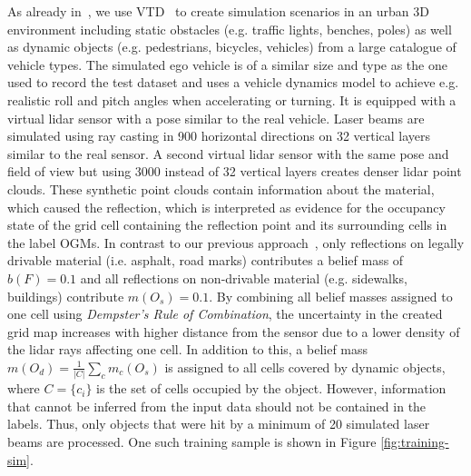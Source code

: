 \documentclass[conference]{IEEEtran}
\begin{document}
As already in~\cite{vanKempen.2021b}, we use VTD~\cite{VirtualTestDrive.2022} to create simulation scenarios in an urban 3D environment including static obstacles (e.g. traffic lights, benches, poles) as well as dynamic objects (e.g. pedestrians, bicycles, vehicles) from a large catalogue of vehicle types. The simulated ego vehicle is of a similar size and type as the one used to record the test dataset and uses a vehicle dynamics model to achieve e.g. realistic roll and pitch angles when accelerating or turning. It is equipped with a virtual lidar sensor with a pose similar to the real vehicle. Laser beams are simulated using ray casting in 900 horizontal directions on 32 vertical layers similar to the real sensor. A second virtual lidar sensor with the same pose and field of view but using 3000 instead of 32 vertical layers creates denser lidar point clouds. These synthetic point clouds contain information about the material, which caused the reflection, which is interpreted as evidence for the occupancy state of the grid cell containing the reflection point and its surrounding cells in the label OGMs. In contrast to our previous approach~\cite{vanKempen.2021b}, only reflections on legally drivable material (i.e. asphalt, road marks) contributes a belief mass of $b(F)=0.1$ and all reflections on non-drivable material (e.g. sidewalks, buildings) contribute $m(O_s)=0.1$. By combining all belief masses assigned to one cell using \textit{Dempster's Rule of Combination}, the uncertainty in the created grid map increases with higher distance from the sensor due to a lower density of the lidar rays affecting one cell. In addition to this, a belief mass $m(O_d) = \frac{1}{|C|} \sum_c{m_c(O_s)}$ is assigned to all cells covered by dynamic objects, where $C = \{c_i\}$ is the set of cells occupied by the object. However, information that cannot be inferred from the input data should not be contained in the labels. Thus, only objects that were hit by a minimum of 20 simulated laser beams are processed. One such training sample is shown in Figure \ref{fig:training-sim}.
\end{document}

